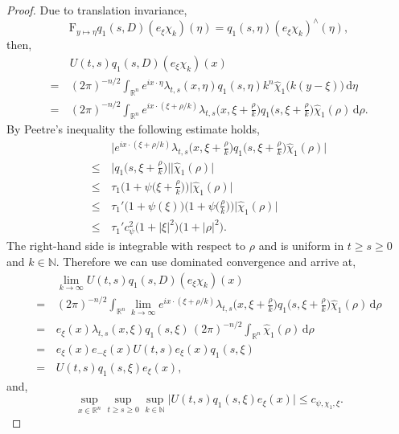 \documentclass[a4paper, 12pt]{report}
\theoremstyle{remark}
\theoremstyle{definition}
\begin{document}
\begin{proof}
Due to translation invariance,
$$
\mathrm{F}_{y \mapsto \eta}q_1(s, D)(e_\xi\chi_k)(\eta) = q_1(s, \eta)(e_\xi\chi_k)^\wedge(\eta),
$$
then,
$$
\begin{aligned}
& \, U(t, s)q_1(s, D)(e_\xi\chi_k)(x)\\
= & \, (2\pi)^{-n/2}\int_{\mathbb{R}^n}e^{ix\cdot\eta}\lambda_{t, s}(x, \eta)q_1(s, \eta)k^n\hat{\chi}_1\big(k(y - \xi)\big)\,\mathrm{d}\eta\\
= & \, (2\pi)^{-n/2}\int_{\mathbb{R}^n}e^{ix\cdot(\xi + \rho/k)}\lambda_{t, s}\Big(x, \xi + \frac{\rho}{k}\Big)q_1\Big(s, \xi + \frac{\rho}{k}\Big)\hat{\chi}_1(\rho)\,\mathrm{d}\rho.
\end{aligned}
$$
By Peetre's inequality the following estimate holds,
$$
\begin{aligned}
& \, \bigg|e^{ix\cdot(\xi + \rho/k)}\lambda_{t, s}\Big(x, \xi + \frac{\rho}{k}\Big)q_1\Big(s, \xi + \frac{\rho}{k}\Big)\hat{\chi}_1(\rho)\bigg|\\
\le & \, \bigg|q_1\Big(s, \xi + \frac{\rho}{k}\Big)\bigg|\big|\hat{\chi}_1(\rho)\big|\\
\le & \, \tau_1\bigg(1 + \psi\Big(\xi + \frac{\rho}{k}\Big)\bigg)\big|\hat{\chi}_1(\rho)\big|\\
\le & \, \tau_1'\big(1 + \psi(\xi)\big)\bigg(1 + \psi\Big(\frac{\rho}{k}\Big)\bigg)\big|\hat{\chi}_1(\rho)\big|\\
\le & \, \tau_1'c_\psi^2\big(1 + |\xi|^2\big)\big(1 + |\rho|^2\big).
\end{aligned}
$$
The right-hand side is integrable with respect to $\rho$ and is uniform in $t \ge s \ge 0$ and $k \in \mathbb{N}$.  Therefore we can use dominated convergence and arrive at,
$$
\begin{aligned}
& \, \lim_{k \to \infty}U(t, s)q_1(s, D)(e_\xi\chi_k)(x)\\
= & \, (2\pi)^{-n/2}\int_{\mathbb{R}^n}\lim_{k \to \infty}e^{ix\cdot(\xi + \rho/k)}\lambda_{t, s}\Big(x, \xi + \frac{\rho}{k}\Big)q_1\Big(s, \xi + \frac{\rho}{k}\Big)\hat{\chi}_1(\rho)\,\mathrm{d}\rho\\
= & \, e_\xi(x)\lambda_{t, s}(x, \xi)q_1(s, \xi)\,(2\pi)^{-n/2}\int_{\mathbb{R}^n}\hat{\chi}_1(\rho)\,\mathrm{d}\rho\\
= & \, e_\xi(x)e_{-\xi}(x)U(t, s)e_\xi(x)q_1(s, \xi)\\
= & \, U(t, s)q_1(s, \xi)e_\xi(x),
\end{aligned}
$$
and,
$$
\sup_{x \in \mathbb{R}^n}\sup_{t \ge s \ge 0}\sup_{k \in \mathbb{N}}\big|U(t, s)q_1(s, \xi)e_\xi(x)\big| \le c_{\psi, \chi_1, \xi}.
$$
\end{proof}
\end{document}
